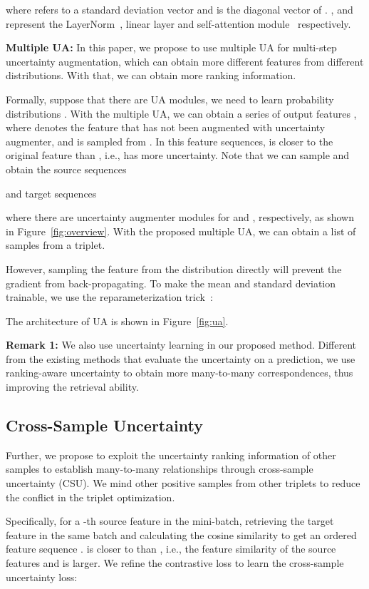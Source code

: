 \documentclass[letterpaper]{article} \usepackage{aaai24}  \usepackage{times}  \usepackage{helvet}  \usepackage{courier}  \usepackage[hyphens]{url}  \usepackage{graphicx} \urlstyle{rm} \def\UrlFont{\rm}  \usepackage{natbib}  \usepackage{caption} \frenchspacing  \setlength{\pdfpagewidth}{8.5in} \setlength{\pdfpageheight}{11in} \usepackage{amsmath,amsfonts}
\begin{document}
where  refers to a standard deviation vector and  is the diagonal vector of . ,  and  represent the LayerNorm~\cite{ba2016layer}, linear layer and self-attention module~\cite{lin2017structured} respectively. 

\textbf{Multiple UA:}
In this paper, we propose to use multiple UA for multi-step uncertainty augmentation, which can obtain more different features from different distributions. With that, we can obtain more ranking information. 

Formally, suppose that there are  UA modules, we need to learn  probability distributions . With the multiple UA, we can obtain a series of output features , where  denotes the feature that has not been augmented with uncertainty augmenter, and  is sampled from . In this feature sequences,  is closer to the original feature  than , i.e.,  has more uncertainty. Note that we can sample and obtain the source sequences 

and target sequences 

where there are  uncertainty augmenter modules for  and , respectively, as shown in Figure~\ref{fig:overview}. With the proposed multiple UA, we can obtain a list of samples from a triplet. 

However, sampling the feature from the distribution  directly will prevent the gradient from back-propagating. To make the mean and standard deviation trainable, we use the reparameterization trick~\cite{kingma2014vae}:

The architecture of UA is shown in Figure~\ref{fig:ua}.

\textbf{Remark 1:} We also use uncertainty learning in our proposed method. Different from the existing methods that evaluate the  uncertainty on a prediction, we use ranking-aware uncertainty to obtain more many-to-many correspondences, thus improving the retrieval ability. 

\subsection{Cross-Sample Uncertainty}
Further, we propose to exploit the uncertainty ranking information of other samples to establish many-to-many relationships through cross-sample uncertainty (CSU). We mind other positive samples from other triplets to reduce the conflict in the triplet optimization. 

Specifically, for a -th source feature  in the mini-batch, retrieving the target feature  in the same batch and calculating the cosine similarity to get an ordered feature sequence .  is closer to  than , i.e., the feature similarity of the source features and  is larger.
We refine the contrastive loss to learn the cross-sample uncertainty loss:
\end{document}

